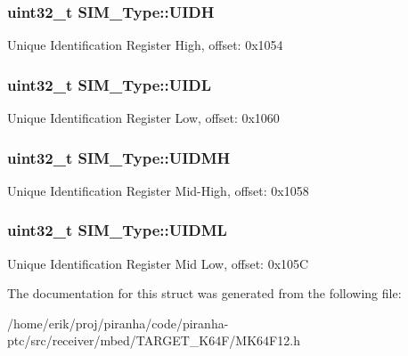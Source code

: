 \subsubsection[{\texorpdfstring{U\+I\+DH}{UIDH}}]{ uint32\+\_\+t S\+I\+M\+\_\+\+Type\+::\+U\+I\+DH}\hypertarget{structSIM__Type_a1909475cfbad89255bfce0b2b8f426c8}{}\label{structSIM__Type_a1909475cfbad89255bfce0b2b8f426c8}
Unique Identification Register High, offset\+: 0x1054 
\subsubsection[{\texorpdfstring{U\+I\+DL}{UIDL}}]{ uint32\+\_\+t S\+I\+M\+\_\+\+Type\+::\+U\+I\+DL}\hypertarget{structSIM__Type_a7e55725c1aeddef811d669f56c978529}{}\label{structSIM__Type_a7e55725c1aeddef811d669f56c978529}
Unique Identification Register Low, offset\+: 0x1060 
\subsubsection[{\texorpdfstring{U\+I\+D\+MH}{UIDMH}}]{ uint32\+\_\+t S\+I\+M\+\_\+\+Type\+::\+U\+I\+D\+MH}\hypertarget{structSIM__Type_a3673a8cdd4cf80d15491e56214ee3124}{}\label{structSIM__Type_a3673a8cdd4cf80d15491e56214ee3124}
Unique Identification Register Mid-\/\+High, offset\+: 0x1058 
\subsubsection[{\texorpdfstring{U\+I\+D\+ML}{UIDML}}]{ uint32\+\_\+t S\+I\+M\+\_\+\+Type\+::\+U\+I\+D\+ML}\hypertarget{structSIM__Type_a1995ae7c6cbcede0825d67e2fc3505ca}{}\label{structSIM__Type_a1995ae7c6cbcede0825d67e2fc3505ca}
Unique Identification Register Mid Low, offset\+: 0x105C 

The documentation for this struct was generated from the following file\+:\begin{DoxyCompactItemize}
\item 
/home/erik/proj/piranha/code/piranha-\/ptc/src/receiver/mbed/\+T\+A\+R\+G\+E\+T\+\_\+\+K64\+F/M\+K64\+F12.\+h\end{DoxyCompactItemize}
